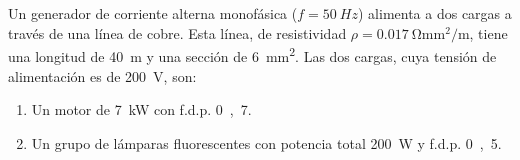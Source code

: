 \documentclass[12pt]{article}
\begin{document}
\clearpage

\section{}






Un generador de corriente alterna monofásica ($f = \SI{50}{Hz}$) alimenta a dos cargas a través de una línea de cobre. Esta línea, de resistividad $\rho = \SI{0.017}{\ohm\milli\meter\squared\per\meter}$, tiene una longitud de \SI{40}{m} y una sección de \SI{6}{\milli\meter\squared}. Las dos cargas, cuya tensión de alimentación es de \SI{200}{\volt}, son:
\begin{enumerate}
\item Un motor de \SI{7}{\kilo\watt} con f.d.p. \si{0,7}.
\item Un grupo de lámparas fluorescentes con potencia total \SI{200}{\watt} y f.d.p. \si{0,5}.
\end{enumerate}
\end{document}
